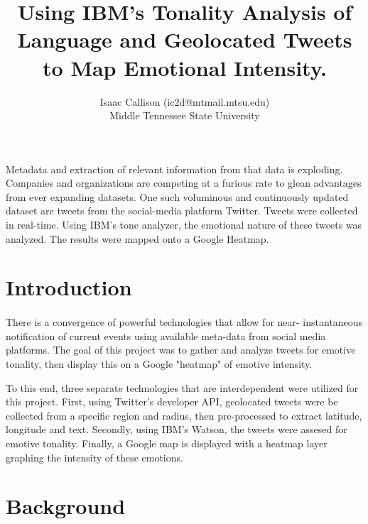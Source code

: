 \documentclass[12pt, oneside]{article}
\title{Using IBM's Tonality Analysis of Language and Geolocated Tweets to Map Emotional Intensity.
\\\medskip}
\author{Isaac Callison (ic2d@mtmail.mtsu.edu)\\Middle Tennessee State University}
\begin{document}
\maketitle
\nocite{*}
\newpage{}


\renewenvironment{abstract}
 {\small
  \begin{center}
  \bfseries \abstractname\vspace{-.5em}\vspace{0pt}
  \end{center}
  \list{}{
    \setlength{\leftmargin}{.8cm}%
    \setlength{\rightmargin}{\leftmargin}%
  }%
  \item\relax}
 {\endlist}

\begin{abstract}
Metadata and extraction of relevant information from that data is exploding.
Companies and organizations are competing at a furious rate to glean advantages
from ever expanding datasets. One such voluminous and continuously updated
dataset are tweets from the social-media platform Twitter. Tweets were collected
in real-time. Using IBM's tone analyzer, the emotional nature of these tweets
was analyzed. The results were mapped onto a Google Heatmap.
\end{abstract}



\section{Introduction}
\paragraph{}
There is a convergence of powerful technologies that allow for near-
instantaneous notification of current events using available meta-data from
social media platforms. The goal of this project was to gather and analyze
tweets for emotive tonality, then display this on a Google "heatmap" of emotive
intensity.

To this end, three separate technologies that are interdependent were utilized
for this project. First, using Twitter's developer API, geolocated tweets were be collected from a specific region and radius, then pre-processed to extract
latitude, longitude and text. Secondly, using IBM's Watson, the tweets were
assesed for emotive tonality. Finally, a Google map is displayed with a
heatmap layer graphing the intensity of these emotions.


\section{Background}
\end{document}
